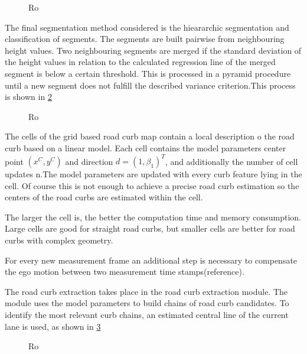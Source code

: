 \documentclass[conference]{IEEEtran}
\begin{document}
\begin{figure}[ht]
	\centering
	\caption{Ro}
	\label{fig3}
\end{figure}

The final segmentation method considered is the hieararchic segmentation and classification of segments. The segments are built pairwise from neighbouring height values. Two neighbouring segments are merged if the standard deviation of the height values in relation to the calculated regression line of the merged segment is below a certain threshold. This is processed in a pyramid procedure until a new segment does not fulfill the described variance criterion.This process is shown in \ref{fig4}

\begin{figure}[ht]
	\centering
	\caption{Ro}
	\label{fig4}
\end{figure}

The cells of the grid based road curb map contain a local description o the road curb based on a linear model. Each cell contains the model parameters center point $(x^C, y^C)$ and direction $d = (1, \beta_1)^T$, and additionally the number of cell updates n.The model parameters are updated with every curb feature lying in the cell. Of course this is not enough to achieve a precise road curb estimation so the centers of the road curbs are estimated within the cell.

The larger the cell is, the better the computation time and memory consumption. Large cells are good for straight road curbs, but smaller cells are better for road curbs with complex geometry.

For every new measurement frame an additional step is necessary to compensate the ego motion between two measurement time stamps(reference). 

The road curb extraction takes place in the road curb extraction module. The module uses the model parameters to build chains of road curb candidates. To identify the most relevant curb chains, an estimated central line of the current lane is used, as shown in \ref{fig5}



\begin{figure}[ht]
	\centering
	\caption{Ro}
	\label{fig5}
\end{figure}
\end{document}
